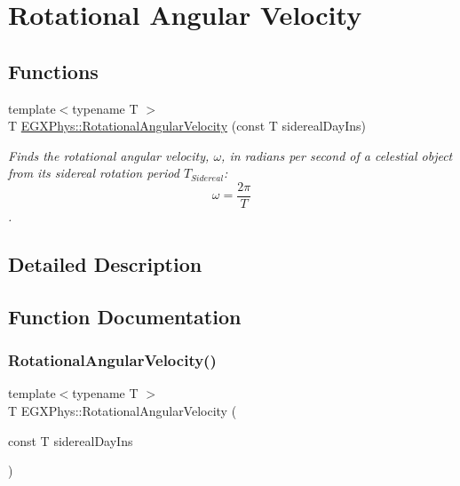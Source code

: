 \hypertarget{group___e_g_x_phys-_astrophysics-_rotational_angular_velocity}{}\section{Rotational Angular Velocity}
\label{group___e_g_x_phys-_astrophysics-_rotational_angular_velocity}
\subsection*{Functions}
\begin{DoxyCompactItemize}
\item 
{\footnotesize template$<$typename T $>$ }\\T \mbox{\hyperlink{group___e_g_x_phys-_astrophysics-_rotational_angular_velocity_gad8966c9d42ff617677152fa014f7d1db}{E\+G\+X\+Phys\+::\+Rotational\+Angular\+Velocity}} (const T sidereal\+Day\+Ins)
\begin{DoxyCompactList}\small\item\em Finds the rotational angular velocity, $\omega$, in radians per second of a celestial object from its sidereal rotation period $T_{Sidereal}$\+: \[ \omega = \dfrac{2\pi}{T} \]. \end{DoxyCompactList}\end{DoxyCompactItemize}


\subsection{Detailed Description}


\subsection{Function Documentation}
\mbox{\label{group___e_g_x_phys-_astrophysics-_rotational_angular_velocity_gad8966c9d42ff617677152fa014f7d1db}} 
\subsubsection{\texorpdfstring{Rotational\+Angular\+Velocity()}{RotationalAngularVelocity()}}
{\footnotesize\ttfamily template$<$typename T $>$ \\
T E\+G\+X\+Phys\+::\+Rotational\+Angular\+Velocity (\begin{DoxyParamCaption}\item[{const T}]{sidereal\+Day\+Ins }\end{DoxyParamCaption})}



